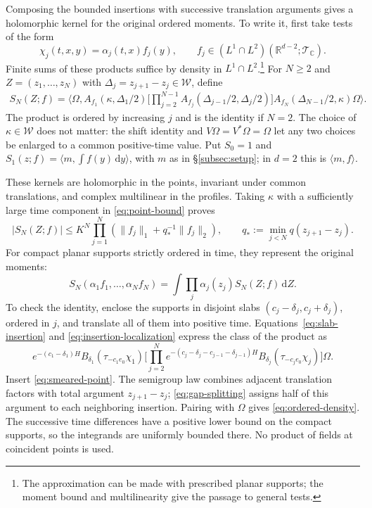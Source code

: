 \documentclass[11pt, letterpaper, reqno]{amsart}
\theoremstyle{definition}
\theoremstyle{remark}
\newcommand{\bbC}{\mathbb{C}}
\newcommand{\bbR}{\mathbb{R}}
\newcommand{\calT}{\mathcal{T}}
\newcommand{\calW}{\mathcal{W}}
\newcommand{\dd}{\,\mathrm{d}}
\begin{document}
Composing the bounded insertions with successive translation
arguments gives a holomorphic kernel for the original ordered
moments. To write it, first take tests of the form
\begin{equation}
 \chi_j(t,x,y)=\alpha_j(t,x)f_j(y),\qquad
 f_j\in(L^1\cap L^2)(\bbR^{d-2};\calT_\bbC).
\end{equation}
Finite sums of these products suffice by density in $L^1\cap L^2$.\footnote{The
approximation can be made with prescribed planar supports; the moment
bound and multilinearity give the passage to general tests.}
For $N\geq2$ and $Z=(z_1,\dots,z_N)$ with
$\Delta_j=z_{j+1}-z_j\in\calW$, define
\begin{equation}\label{eq:ordered-kernel}
\begin{split}
 S_N(Z;f)=\big\langle\Omega,
 A_{f_1}(\kappa,\Delta_1/2)
 \Big[\prod_{j=2}^{N-1}A_{f_j}(\Delta_{j-1}/2,\Delta_j/2)\Big]
 A_{f_N}(\Delta_{N-1}/2,\kappa)\Omega\big\rangle.
\end{split}
\end{equation}
The product is ordered by increasing $j$ and is the identity if $N=2$.
The choice of $\kappa\in\calW$ does not matter: the shift identity and
$V\Omega=V^*\Omega=\Omega$ let any two choices be enlarged to a common
positive-time value. Put $S_0=1$ and
$S_1(z;f)=\langle m,\int f(y)\dd y\rangle$, with $m$ as in
\S\ref{subsec:setup}; in $d=2$ this is $\langle m,f\rangle$.

These kernels are holomorphic in the points, invariant under common
translations, and complex multilinear in the profiles. Taking
$\kappa$ with a sufficiently large time component in
\eqref{eq:point-bound} proves
\begin{equation}\label{eq:kernel-estimate}
 |S_N(Z;f)|\leq K^N\prod_{j=1}^N
      \left(\|f_j\|_1+q_*^{-1}\|f_j\|_2\right),
 \qquad q_*:=\min_{j<N}q(z_{j+1}-z_j).
\end{equation}
For compact planar supports strictly ordered in time, they represent
the original moments:
\begin{equation}\label{eq:ordered-density}
 S_N(\alpha_1f_1,\dots,\alpha_Nf_N)
 =\int\prod_j\alpha_j(z_j)S_N(Z;f)\dd Z.
\end{equation}
To check the identity, enclose the supports in disjoint slabs
$(c_j-\delta_j,c_j+\delta_j)$, ordered in $j$, and translate all of
them into positive time. Equations~\eqref{eq:slab-insertion} and
\eqref{eq:insertion-localization} express the class of the product as
\begin{equation}\label{eq:ordered-product}
 e^{-(c_1-\delta_1)H}B_{\delta_1}(\tau_{-c_1e_0}\chi_1)
 \Big[\prod_{j=2}^N e^{-(c_j-\delta_j-c_{j-1}-\delta_{j-1})H}
 B_{\delta_j}(\tau_{-c_je_0}\chi_j)\Big]\Omega.
\end{equation}
Insert \eqref{eq:smeared-point}. The semigroup law combines adjacent
translation factors with total argument $z_{j+1}-z_j$;
\eqref{eq:gap-splitting} assigns half of this argument to each
neighboring insertion. Pairing with $\Omega$ gives
\eqref{eq:ordered-density}. The successive time differences have a
positive lower bound on the compact supports, so the integrands are
uniformly bounded there. No product of fields at coincident points is used.
\end{document}
